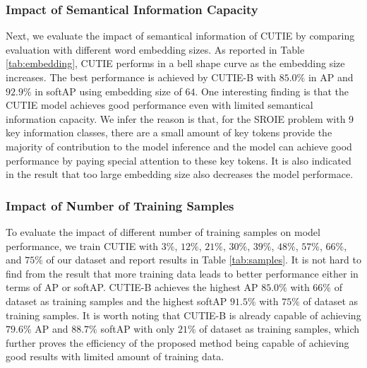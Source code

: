 \documentclass[10pt,twocolumn,letterpaper]{article}
\begin{document}
\subsubsection{Impact of Semantical Information Capacity}
\label{parameters}
Next, we evaluate the impact of semantical information of CUTIE by comparing evaluation with different word embedding sizes. As reported in Table \ref{tab:embedding}, CUTIE performs in a bell shape curve as the embedding size increases. The best performance is achieved by CUTIE-B with $85.0\%$ in AP and $92.9\%$ in softAP using embedding size of $64$. One interesting finding is that the CUTIE model achieves good performance even with limited semantical information capacity. We infer the reason is that, for the SROIE problem with 9 key information classes, there are a small amount of key tokens provide the majority of contribution to the model inference and the model can achieve good performance by paying special attention to these key tokens. It is also indicated in the result that too large embedding size also decreases the model performace. 

\subsubsection{Impact of Number of Training Samples}
To evaluate the impact of different number of training samples on model performance, we train CUTIE with $3\%$, $12\%$, $21\%$, $30\%$, $39\%$, $48\%$, $57\%$, $66\%$, and $75\%$ of our dataset and report results in Table \ref{tab:samples}. It is not hard to find from the result that more training data leads to better performance either in terms of AP or softAP. CUTIE-B achieves the highest AP $85.0\%$ with $66\%$ of dataset as training samples and the highest softAP $91.5\%$ with $75\%$ of dataset as training samples. It is worth noting that CUTIE-B is already capable of achieving $79.6\%$ AP and $88.7\%$ softAP with only $21\%$ of dataset as training samples, which further proves the efficiency of the proposed method being capable of achieving good results with limited amount of training data.
\end{document}
